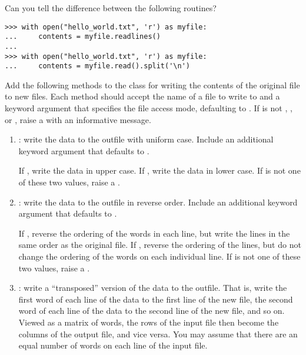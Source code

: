 Can you tell the difference between the following routines?

\begin{lstlisting}
>>> with open("hello_world.txt", 'r') as myfile:
...     contents = myfile.readlines()
...
>>> with open("hello_world.txt", 'r') as myfile:
...     contents = myfile.read().split('\n')
\end{lstlisting}

\begin{problem} %
Add the following methods to the  class for writing the contents of the original file to new files.
Each method should accept the name of a file to write to and a keyword argument  that specifies the file access mode, defaulting to .
If  is not , , or , raise a  with an informative message.

\begin{enumerate}
\item {}: write the data to the outfile with uniform case. Include an additional keyword argument  that defaults to .

If , write the data in upper case.
If , write the data in lower case.
If  is not one of these two values, raise a .

\item {}: write the data to the outfile in reverse order. Include an additional keyword argument  that defaults to .

If , reverse the ordering of the words in each line, but write the lines in the same order as the original file.
If , reverse the ordering of the lines, but do not change the ordering of the words on each individual line.
If  is not one of these two values, raise a .

\item {}: write a ``transposed'' version of the data to the outfile.
That is, write the first word of each line of the data to the first line of the new file, the second word of each line of the data to the second line of the new file, and so on.
Viewed as a matrix of words, the rows of the input file then become the columns of the output file, and vice versa.
You may assume that there are an equal number of words on each line of the input file.
\end{enumerate}


\end{problem}

